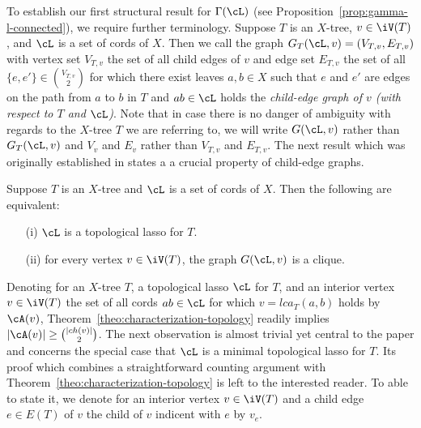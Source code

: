 To establish our first structural result for $\Gamma(\cL)$ (see
Proposition~\ref{prop:gamma-l-connected}), we require further terminology.
Suppose $T$ is an $X$-tree, $v\in \iV(T)$, and $\cL$ is a set of cords of
$X$. Then we call the graph $G_T(\cL,v)=(V_{T,v},E_{T,v})$ with vertex set
$V_{T,v}$ the set of all child edges of $v$ and edge set $E_{T,v}$ the set of
all $\{e,e'\}\in {V_{T,v}\choose 2}$ for which there exist leaves $a,b\in X$
such that $e$ and $e'$ are edges on the path from $a$ to $b$ in $T$ and $ab\in
\cL$ holds the {\em child-edge graph of $v$ (with respect to $T$ and
  $\cL$)}. Note that in case there is no danger of ambiguity with regards to
the $X$-tree $T$ we are referring to, we will write $G(\cL,v)$ rather than
$G_T(\cL,v)$ and $V_v$ and $E_v$ rather than $V_{T,v}$ and $E_{T,v}$. The next
result which was originally established in \cite[Theorem 7.1]{HP13} states a a
crucial property of child-edge graphs.

\begin{thm}\label{theo:characterization-topology}
Suppose $T$ is an $X$-tree and 
$\cL$ is a set of cords of $X$. 
Then the following are equivalent:
\begin{enumerate}
\item[(i)] $\cL$ is a topological lasso for $T$.
\item[(ii)] for every vertex $v\in \iV(T)$, the graph
$G(\cL,v)$ is a clique.
\end{enumerate}
\end{thm}



Denoting for an $X$-tree $T$, a topological lasso $\cL$ for $T$, and an
interior vertex $v\in \iV(T)$ the set of all cords $ab\in \cL$ for which
$v=lca_T(a,b)$ holds by $\cA(v)$, Theorem~\ref{theo:characterization-topology}
readily implies $|\cA(v)|\geq {|ch(v)|\choose 2}$.  The next observation is
almost trivial yet central to the paper and concerns the special case that
$\cL$ is a minimal topological lasso for $T$. Its proof which combines a
straightforward counting argument with
Theorem~\ref{theo:characterization-topology} is left to the interested
reader. To able to state it, we denote for an interior vertex $v\in \iV(T)$
and a child edge $e\in E(T)$ of $v$ the child of $v$ indicent with $e$ by
$v_e$.

